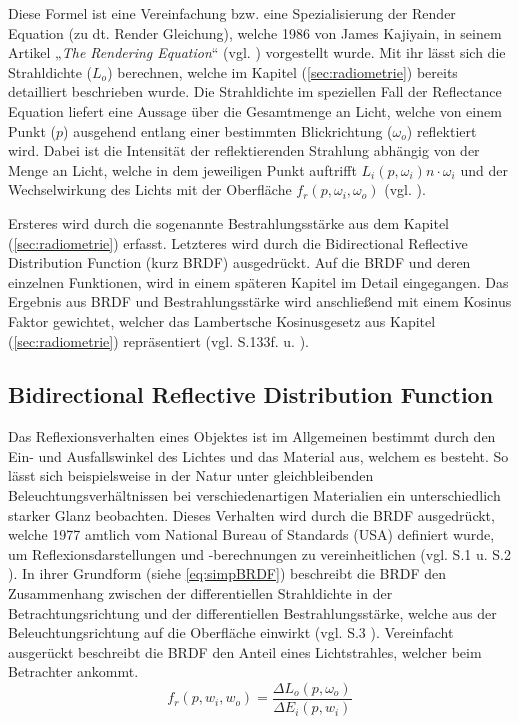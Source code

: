 \documentclass[
  11pt,
  a4paper,
  oneside
  ]{article}
\begin{document}
Diese Formel ist eine Vereinfachung bzw. eine Spezialisierung der Render Equation (zu dt. Render Gleichung), welche 1986 von James Kajiyain, in seinem Artikel „\textit{The Rendering Equation}“ (vgl. \cite{theRenderingEquation}) vorgestellt wurde. Mit ihr lässt sich die Strahldichte ($L_{o}$) berechnen, welche im Kapitel (\ref{sec:radiometrie}) bereits detailliert beschrieben wurde. Die Strahldichte im speziellen Fall der Reflectance Equation liefert eine Aussage über die Gesamtmenge an Licht, welche von einem Punkt ($p$) ausgehend entlang einer bestimmten Blickrichtung ($\omega_{o}$) reflektiert wird. Dabei ist die Intensität der reflektierenden Strahlung abhängig von der Menge an Licht, welche in dem jeweiligen Punkt auftrifft $L_{i}\left( p,\omega_{i}\right)n\cdot \omega_{i}$ und der Wechselwirkung des Lichts mit der Oberfläche $f_{r}\left( p,\omega_{i},\omega_{o}\right)$ (vgl. \cite{learnOpenGL}). 

Ersteres wird durch die sogenannte Bestrahlungsstärke aus dem Kapitel (\ref{sec:radiometrie}) erfasst. Letzteres wird durch die Bidirectional Reflective Distribution Function (kurz BRDF) ausgedrückt. Auf die BRDF und deren einzelnen Funktionen, wird in einem späteren Kapitel im Detail eingegangen. Das Ergebnis aus BRDF und Bestrahlungsstärke wird anschließend mit einem Kosinus Faktor gewichtet, welcher das Lambertsche Kosinusgesetz aus Kapitel (\ref{sec:radiometrie}) repräsentiert 
(vgl. S.133f. \cite{openGlWolf} u. \cite{learnOpenGL}).

\subsection{Bidirectional Reflective Distribution Function}
Das Reflexionsverhalten eines Objektes ist im Allgemeinen bestimmt durch den Ein- und Ausfallswinkel des Lichtes und das Material aus, welchem es besteht. So lässt sich beispielsweise in der Natur unter gleichbleibenden Beleuchtungsverhältnissen bei verschiedenartigen Materialien ein unterschiedlich starker Glanz beobachten. Dieses Verhalten wird durch die BRDF ausgedrückt, welche 1977 amtlich vom National Bureau of Standards (USA) definiert wurde, um Reflexionsdarstellungen und -berechnungen zu vereinheitlichen 
(vgl. S.1 \cite{irrlichtOrg} u. S.2 \cite{uniUlm}). In ihrer Grundform (siehe \ref{eq:simpBRDF}) beschreibt die BRDF den Zusammenhang zwischen der differentiellen Strahldichte in der Betrachtungsrichtung und der differentiellen Bestrahlungsstärke, welche aus der Beleuchtungsrichtung auf die Oberfläche einwirkt 
(vgl. S.3 \cite{irrlichtOrg}). Vereinfacht ausgerückt beschreibt die BRDF den Anteil eines Lichtstrahles, welcher beim Betrachter ankommt.
\begin{equation}\label{eq:simpBRDF}
  f_{r}\left( p,w_{i},w_{o}\right) =\dfrac{\Delta L_{o}\left( p,\omega _{o}\right) }{\Delta E_{i}\left( p,w_{i}\right) }
\end{equation}
\end{document}
